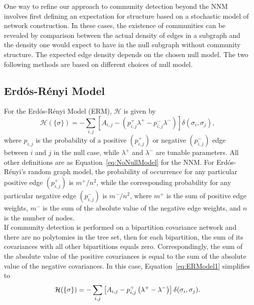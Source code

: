 \documentclass[11pt]{article}
\begin{document}
One way to refine our approach to community detection beyond the NNM involves first
defining an expectation for structure based on a stochastic model of network construction. In
these cases, the existence of communities can be revealed by comparison between the actual
density of edges in a subgraph and the density one would expect to have in the null subgraph
without community structure. The expected edge density depends on the chosen null model.
The two following methods are based on different choices of null model. \\


\subsection{Erd\'{o}s-R\'{e}nyi Model}\label{appendix:ERModel}

For the Erd\'{o}s-R\'{e}nyi Model (ERM), $\mathcal{H}$ is given by
\begin{equation}\label{eq:ERModel1}
\mathcal{H}(\{\sigma\}) = - \displaystyle\sum_{i,j} \left[A_{i,j} -\left(p_{i,j}^{+}\lambda^{+} - p_{i,j}^{-}\lambda^{-}\right)\right]\delta(\sigma_{i}, \sigma_{j}),
\end{equation}
where $p_{i,j}$ is the probability of a positive $(p_{i,j}^{+})$ or negative $(p_{i,j}^{-})$ edge between $i$ and $j$ in the null case, while $\lambda^{+}$ and $\lambda^{-}$ are tunable parameters. All other definitions are as Equation~\eqref{eq:NoNullModel} for the NNM. For Erd\'{o}s-R\'{e}nyi's random graph model, the probability of occurrence for any particular positive edge $(p_{i,j}^{+})$ is $m^{+} / n^{2}$, while the corresponding probability for any particular negative edge $(p_{i,j}^{-})$ is $m^{-} / n^{2}$, where $m^{+}$ is the sum of positive edge weights, $m^{-}$ is the sum of the absolute value of the negative edge weights, and $n$ is the number of nodes.\\


If community detection is performed on a bipartition covariance network and there are no
polytomies in the tree set, then for each bipartition, the sum of its covariances with all other
bipartitions equals zero. Correspondingly, the sum of the absolute value of the positive
covariances is equal to the sum of the absolute value of the negative covariances. In this case, Equation~\eqref{eq:ERModel1} simplifies to
\begin{equation}\label{eq:ERModel2}
\mathcal{H}(\{\sigma\}) = - \displaystyle\sum_{i,j} \left[A_{i,j} -p_{i,j}^{+}\left(\lambda^{+} - \lambda^{-}\right)\right]\delta(\sigma_{i}, \sigma_{j}). \\
\end{equation}
\end{document}
